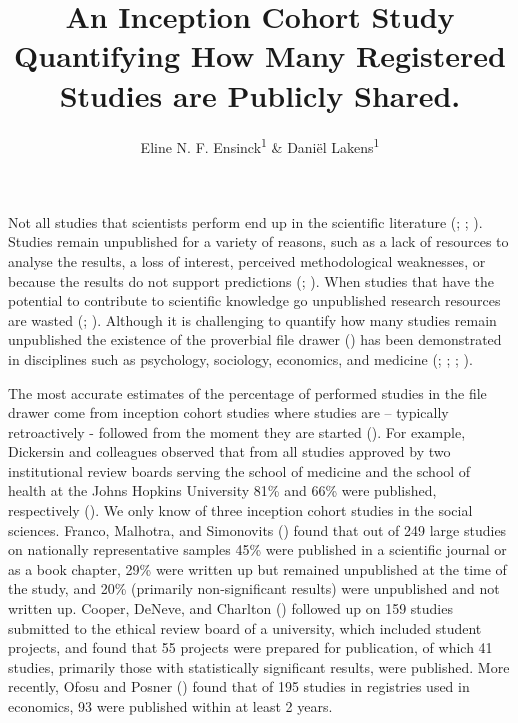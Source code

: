 \documentclass[
  ,man, a4paper,floatsintext]{apa6}
\title{An Inception Cohort Study Quantifying How Many Registered Studies are Publicly Shared.}
\author{Eline N. F. Ensinck\textsuperscript{1} \& Daniël Lakens\textsuperscript{1}}
\date{}
\affiliation{\vspace{0.5cm}\textsuperscript{1} Eindhoven University of Technology}
\begin{document}
\maketitle

Not all studies that scientists perform end up in the scientific literature (; ; ). Studies remain unpublished for a variety of reasons, such as a lack of resources to analyse the results, a loss of interest, perceived methodological weaknesses, or because the results do not support predictions (; ). When studies that have the potential to contribute to scientific knowledge go unpublished research resources are wasted (; ). Although it is challenging to quantify how many studies remain unpublished the existence of the proverbial file drawer () has been demonstrated in disciplines such as psychology, sociology, economics, and medicine (; ; ; ).

The most accurate estimates of the percentage of performed studies in the file drawer come from inception cohort studies where studies are -- typically retroactively - followed from the moment they are started (). For example, Dickersin and colleagues observed that from all studies approved by two institutional review boards serving the school of medicine and the school of health at the Johns Hopkins University 81\% and 66\% were published, respectively (). We only know of three inception cohort studies in the social sciences. Franco, Malhotra, and Simonovits () found that out of 249 large studies on nationally representative samples 45\% were published in a scientific journal or as a book chapter, 29\% were written up but remained unpublished at the time of the study, and 20\% (primarily non-significant results) were unpublished and not written up. Cooper, DeNeve, and Charlton () followed up on 159 studies submitted to the ethical review board of a university, which included student projects, and found that 55 projects were prepared for publication, of which 41 studies, primarily those with statistically significant results, were published. More recently, Ofosu and Posner () found that of 195 studies in registries used in economics, 93 were published within at least 2 years.
\end{document}
